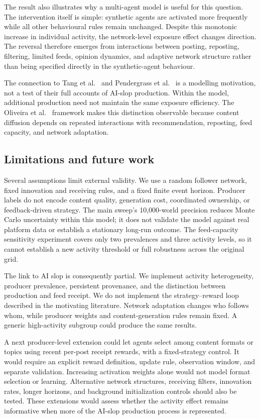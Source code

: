 \documentclass[runningheads]{llncs}
\begin{document}
The result also illustrates why a multi-agent model is useful for this question. The intervention itself is simple: synthetic agents are activated more frequently while all other behavioural rules remain unchanged. Despite this monotonic increase in individual activity, the network-level exposure effect changes direction. The reversal therefore emerges from interactions between posting, reposting, filtering, limited feeds, opinion dynamics, and adaptive network structure rather than being specified directly in the synthetic-agent behaviour.

The connection to Tang et al.~\cite{tang2026} and Pendergrass et al.~\cite{pendergrass2025} is a modelling motivation, not a test of their full accounts of AI-slop production. Within the model, additional production need not maintain the same exposure efficiency. The Oliveira et al.~\cite{oliveira2026} framework makes this distinction observable because content diffusion depends on repeated interactions with recommendation, reposting, feed capacity, and network adaptation.

\subsection{Limitations and future work}

Several assumptions limit external validity. We use a random follower network, fixed innovation and receiving rules, and a fixed finite event horizon. Producer labels do not encode content quality, generation cost, coordinated ownership, or feedback-driven strategy. The main sweep's 10,000-world precision reduces Monte Carlo uncertainty within this model; it does not validate the model against real platform data or establish a stationary long-run outcome. The feed-capacity sensitivity experiment covers only two prevalences and three activity levels, so it cannot establish a new activity threshold or full robustness across the original grid.

The link to AI slop is consequently partial. We implement activity heterogeneity, producer prevalence, persistent provenance, and the distinction between production and feed receipt. We do not implement the strategy--reward loop described in the motivating literature. Network adaptation changes who follows whom, while producer weights and content-generation rules remain fixed. A generic high-activity subgroup could produce the same results.

A next producer-level extension could let agents select among content formats or topics using recent per-post receipt rewards, with a fixed-strategy control. It would require an explicit reward definition, update rule, observation window, and separate validation. Increasing activation weights alone would not model format selection or learning. Alternative network structures, receiving filters, innovation rates, longer horizons, and background initialization controls should also be tested. These extensions would assess whether the activity effect remains informative when more of the AI-slop production process is represented.
\end{document}
